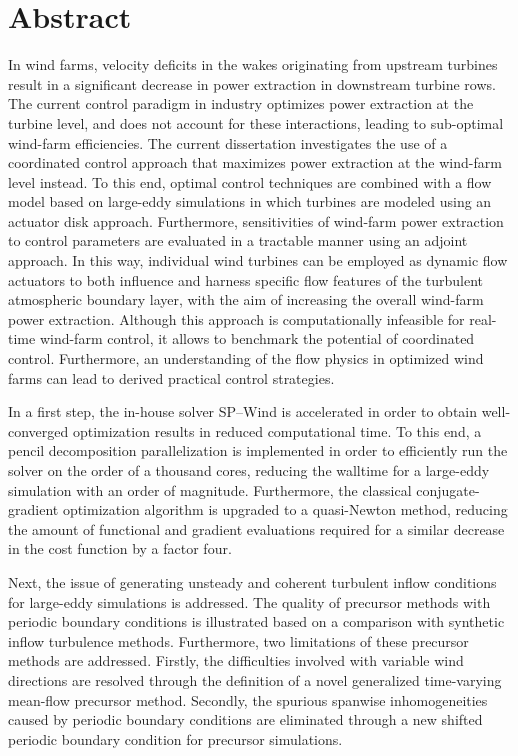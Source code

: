 \chapter{Abstract}                                 \label{ch:abstract}

In wind farms, velocity deficits in the wakes originating from upstream turbines result in a significant decrease in power extraction in downstream turbine rows. The current control paradigm in industry optimizes power extraction at the turbine level, and does not account for these interactions, leading to sub-optimal wind-farm efficiencies. The current dissertation investigates the use of a coordinated control approach that maximizes power extraction at the wind-farm level instead. To this end, optimal control techniques are combined with a flow model based on large-eddy simulations in which turbines are modeled using an actuator disk approach. Furthermore, sensitivities of wind-farm power extraction to control parameters are evaluated in a tractable manner using an adjoint approach. In this way, individual wind turbines can be employed as dynamic flow actuators to both influence and harness specific flow features of the turbulent atmospheric boundary layer, with the aim of increasing the overall wind-farm power extraction. Although this approach is computationally infeasible for real-time wind-farm control, it allows to benchmark the potential of coordinated control. Furthermore, an understanding of the flow physics in optimized wind farms can lead to derived practical control strategies.

In a first step, the in-house solver SP--Wind is accelerated in order to obtain well-converged optimization results in reduced computational time. To this end, a pencil decomposition parallelization is implemented in order to efficiently run the solver on the order of a thousand cores, reducing the walltime for a large-eddy simulation with an order of magnitude. Furthermore, the classical conjugate-gradient optimization algorithm is upgraded to a quasi-Newton method, reducing the amount of functional and gradient evaluations required for a similar decrease in the cost function by a factor four. 

Next, the issue of generating unsteady and coherent turbulent inflow conditions for large-eddy simulations is addressed. The quality of precursor methods with periodic boundary conditions is illustrated based on a comparison with synthetic inflow turbulence methods. Furthermore, two limitations of these precursor methods are addressed. Firstly, the difficulties involved with variable wind directions are resolved through the definition of a novel generalized time-varying mean-flow precursor method. Secondly, the spurious spanwise inhomogeneities caused by periodic boundary conditions are eliminated through a new shifted periodic boundary condition for precursor simulations. 

